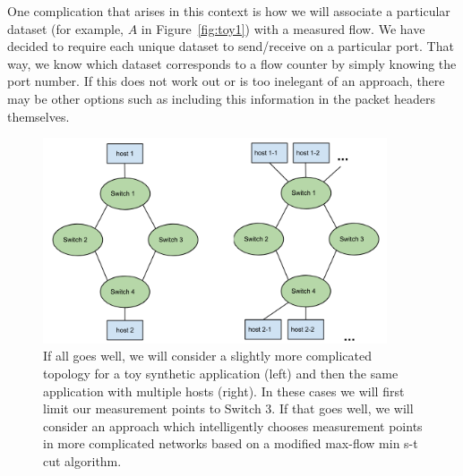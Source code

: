 \documentclass[12pt]{article} \usepackage{graphicx} \usepackage{amsmath}
\begin{document}
One complication that arises in this context is how we will associate a
particular dataset (for example, $A$ in Figure~\ref{fig:toy1}) with a measured
flow.  We have decided to require each unique dataset to send/receive on a
particular port.  That way, we know which dataset corresponds to a flow counter
by simply knowing the port number.  If this does not work out or is too
inelegant of an approach, there may be other options such as including this
information in the packet headers themselves. 

\begin{figure}[t] 
  \centerline{\includegraphics[width=4.0in]{img/topo_comp.png}}
  \caption{If all goes well, we will consider a slightly more complicated topology
  for a toy synthetic application (left) and then the  same application with
  multiple hosts (right). In these cases we will first limit our measurement
  points to Switch 3.  If that goes well, we will consider an approach which
  intelligently chooses measurement points in more complicated networks based on a
  modified max-flow min s-t cut algorithm.} 
  \label{fig:topo_comp} 
\end{figure}
\end{document}
